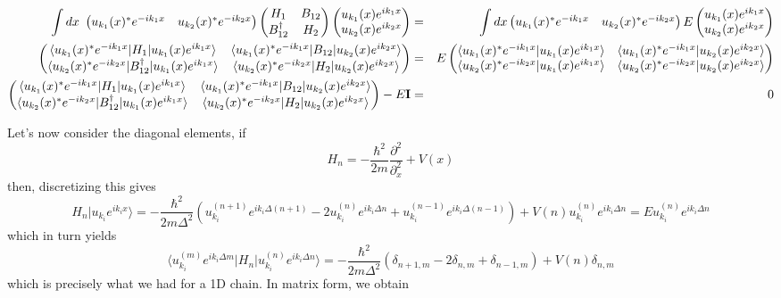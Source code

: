 \documentclass[11pt]{article}
\begin{document}
\begin{eqnarray}
\int dx~
\begin{pmatrix}
u_{k_1}(x)^*e^{-ik_1x} &
u_{k_2}(x)^*e^{-ik_2x}
\end{pmatrix}
\begin{pmatrix}
H_1 & B_{12} \\
B_{12}^{\dagger} & H_2
\end{pmatrix}
\begin{pmatrix}
u_{k_1}(x)e^{ik_1x} \\
u_{k_2}(x)e^{ik_2x}
\end{pmatrix}&=&
\int dx
\begin{pmatrix}
u_{k_1}(x)^*e^{-ik_1x} &
u_{k_2}(x)^*e^{-ik_2x}
\end{pmatrix}
E\begin{pmatrix}
u_{k_1}(x)e^{ik_1x} \\
u_{k_2}(x)e^{ik_2x}
\end{pmatrix}\\
\begin{pmatrix}
\langle u_{k_1}(x)^*e^{-ik_1x} |H_1|u_{k_1}(x)e^{ik_1x}\rangle & \langle u_{k_1}(x)^*e^{-ik_1x}| B_{12}|u_{k_2}(x)e^{ik_2x}\rangle \\
\langle u_{k_2}(x)^*e^{-ik_2x} |B_{12}^{\dagger}|u_{k_1}(x)e^{ik_1x}\rangle & \langle u_{k_2}(x)^*e^{-ik_2x} |  H_2|u_{k_2}(x)e^{ik_2x}\rangle
\end{pmatrix}&=&
E\begin{pmatrix}
\langle u_{k_1}(x)^*e^{-ik_1x} |u_{k_1}(x)e^{ik_1x}\rangle & \langle u_{k_1}(x)^*e^{-ik_1x} |u_{k_2}(x)e^{ik_2x}\rangle \\
\langle u_{k_2}(x)^*e^{-ik_2x} |u_{k_1}(x)e^{ik_1x}\rangle & \langle u_{k_2}(x)^*e^{-ik_2x} |u_{k_2}(x)e^{ik_2x}\rangle
\end{pmatrix}\\
\begin{pmatrix}
\langle u_{k_1}(x)^*e^{-ik_1x} |H_1|u_{k_1}(x)e^{ik_1x}\rangle & \langle u_{k_1}(x)^*e^{-ik_1x}| B_{12}|u_{k_2}(x)e^{ik_2x}\rangle \\
\langle u_{k_2}(x)^*e^{-ik_2x} |B_{12}^{\dagger}|u_{k_1}(x)e^{ik_1x}\rangle & \langle u_{k_2}(x)^*e^{-ik_2x} | H_2|u_{k_2}(x)e^{ik_2x}\rangle
\end{pmatrix}-E{\bf I}&=&0
\end{eqnarray}

Let's now consider the diagonal elements, if \[
H_n = -\frac{\hbar^2}{2m}\frac{\partial^2}{\partial_x^2} + V(x)
\] then, discretizing this gives \[
H_n|u_{k_i}e^{ik_ix}\rangle = -\frac{\hbar^2}{2m\Delta^2}(u_{k_i}^{(n + 1)}e^{ik_i\Delta(n+1)} - 2u_{k_i}^{(n)}e^{ik_i\Delta n} + u_{k_i}^{(n-1)}e^{ik_i\Delta(n-1)}) + V(n)u_{k_i}^{(n)}e^{ik_i\Delta n}= Eu_{k_i}^{(n)}e^{ik_i\Delta n}
\] which in turn yields
\[\langle u_{k_i}^{(m)}e^{ik_i\Delta m} | H_n | u_{k_i}^{(n)}e^{ik_i\Delta n}\rangle =-\frac{\hbar^2}{2m\Delta^2}(\delta_{n+1,m} - 2\delta_{n,m} + \delta_{n-1, m}) + V(n)\delta_{n,m}
\] which is precisely what we had for a 1D chain. In matrix form, we
obtain
\end{document}
